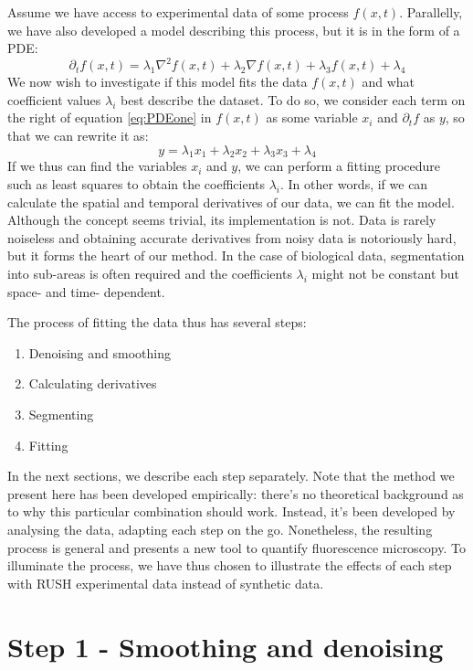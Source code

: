 \documentclass{Dissertate}
\providecommand{\tightlist}{%
  \setlength{\itemsep}{0pt}\setlength{\parskip}{0pt}}
\begin{document}
Assume we have access to experimental data of some process \(f(x,t)\).
Parallelly, we have also developed a model describing this process, but
it is in the form of a PDE: 
\begin{equation}
	\label{eq:PDEone}
	\partial_t f(x,t) = \lambda_1 \nabla^2f(x,t)+\lambda_2\nabla f(x,t) +\lambda_3 f(x,t) +\lambda_4
\end{equation} 
We now wish to investigate if this model fits the data \(f(x,t)\) and what coefficient values \(\lambda_i\) best describe the dataset.
To do so, we consider each term on the right of equation \ref{eq:PDEone} in \(f(x,t)\) as some variable \(x_i\) and \(\partial_t f\) as \(y\),
so that we can rewrite it as: \[
y = \lambda_1 x_1+\lambda_2x_2 +\lambda_3 x_3 +\lambda_4
\]
If we thus can find the variables \(x_i\) and \(y\), we can perform a
fitting procedure such as least squares to obtain the coefficients
\(\lambda_i\). In other words, if we can calculate the spatial and
temporal derivatives of our data, we can fit the model. Although the
concept seems trivial, its implementation is not. Data is rarely
noiseless and obtaining accurate derivatives from noisy data is
notoriously hard, but it forms the heart of our method. In the case of biological data, segmentation into sub-areas is often required and the coefficients \(\lambda_i\) might
not be constant but space- and time- dependent. 

\newpage
The process of fitting the data thus has several steps:

\begin{enumerate}
\def\labelenumi{\arabic{enumi}.}
\tightlist
\item
  Denoising and smoothing
\item
  Calculating derivatives
\item
  Segmenting
\item
  Fitting
\end{enumerate}

In the next sections, we describe each step separately. Note that the
method we present here has been developed empirically: there's no
theoretical background as to why this particular combination should work. Instead, it's been developed by analysing the data,
adapting each step on the go. Nonetheless, the resulting process is general and presents a new tool to quantify fluorescence microscopy. To illuminate the process, we have thus chosen to illustrate the effects of each step with RUSH experimental data instead of synthetic data.


\hypertarget{step-1---smoothing-and-denoising}{%
\section{Step 1 - Smoothing and
denoising}\label{step-1---smoothing-and-denoising}}
\end{document}

